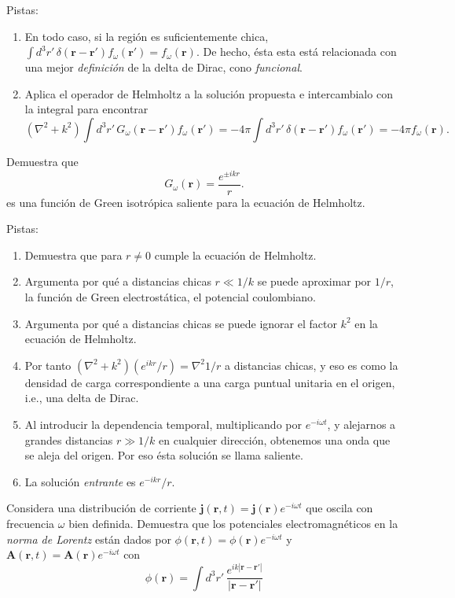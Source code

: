 \documentclass{exam}
\newenvironment{pistas}{\par\noindent Pistas:\begin{enumerate}} {\end{enumerate}}
\begin{document}
\begin{questions}
\begin{pistas}
    vale cero en todo el espacio excepto en una pequeña región de
    tamaño despreciable sobre la cual la integral vale 1.
  \item En todo caso, si la región es suficientemente chica,
    $\int d^3r'\,\delta(\bm r-\bm r')f_\omega(\bm r')=f_\omega(\bm r)$. De hecho,
    ésta esta está relacionada con una mejor {\em definición} de la
    delta de Dirac, cono {\em funcional}.
  \item Aplica el operador de Helmholtz a la solución propuesta e
    intercambialo con la integral para encontrar
    $$
    (\nabla^2+k^2)\int d^3r'\, G_\omega(\bm r-\bm r') f_\omega(\bm
    r')=-4\pi\int d^3r'\, \delta(\bm r-\bm r') f_\omega(\bm r')=-4\pi f_\omega(\bm r).
    $$

  \end{pistas}
\question \label{o} Demuestra que
  $$
  G_\omega(\bm r)=\frac{e^{\pm ikr}}{r}.
  $$
  es una función de Green isotrópica saliente para la ecuación de Helmholtz.
  \begin{pistas}
  \item Demuestra que para $r\ne 0$ cumple la ecuación de Helmholtz.
  \item Argumenta por qué a distancias chicas $r\ll 1/k$ se puede
    aproximar por $1/r$, la función de Green electrostática, el
    potencial coulombiano.
  \item Argumenta por qué a distancias chicas se puede ignorar el
    factor $k^2$ en la ecuación de Helmholtz.
  \item Por tanto $(\nabla^2+k^2)(e^{ikr}/r)=\nabla^2 1/r$ a
    distancias chicas, y eso es como la densidad de carga
    correspondiente a una carga puntual unitaria en el origen, i.e.,
    una delta de Dirac.
  \item Al introducir la dependencia temporal, multiplicando por
    $e^{-i\omega t}$, y alejarnos a grandes distancias $r\gg 1/k$ en
    cualquier dirección, obtenemos una onda que se aleja del
    origen. Por eso ésta solución se llama saliente.
  \item La solución {\em entrante} es $e^{-ikr}/r$.
  \end{pistas}
\question \label{p} Considera una distribución de corriente $\bm
  j(\bm r,t)=\bm j(\bm r)e^{-i\omega t}$ que oscila con frecuencia
  $\omega$ bien definida. Demuestra que los potenciales
  electromagnéticos en la {\em norma de Lorentz} están dados por
  $\phi(\bm r,t)=\phi(\bm r)e^{-i\omega t}$ y   $\bm A(\bm r,t)=\bm
  A(\bm r)e^{-i\omega t}$ con
  $$
  \phi(\bm r)=\int d^3r'\, \frac{e^{ik|\bm r-\bm r'|}}{|\bm r-\bm r'|}
$$
\end{questions}
\end{document}
